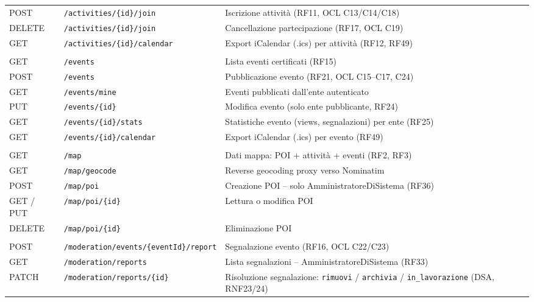 \documentclass[11pt,a4paper]{article}
\newcommand{\code}[1]{\texttt{\small#1}}
\begin{document}
\begin{small}
\begin{longtable}{>{\centering\arraybackslash}p{1.6cm} p{7.2cm} p{6.2cm}}
  \rowcolor{rowAlt}POST & \code{/activities/\{id\}/join} & Iscrizione attivit\`{a} (RF11, OCL C13/C14/C18) \\
  DELETE & \code{/activities/\{id\}/join} & Cancellazione partecipazione (RF17, OCL C19) \\
  \rowcolor{rowAlt}GET & \code{/activities/\{id\}/calendar} & Export iCalendar (.ics) per attivit\`{a} (RF12, RF49) \\
  \midrule
  \multicolumn{3}{l}{\textbf{Eventi certificati}} \\
  \midrule
  GET & \code{/events} & Lista eventi certificati (RF15) \\
  \rowcolor{rowAlt}POST & \code{/events} & Pubblicazione evento (RF21, OCL C15--C17, C24) \\
  GET & \code{/events/mine} & Eventi pubblicati dall'ente autenticato \\
  \rowcolor{rowAlt}PUT & \code{/events/\{id\}} & Modifica evento (solo ente pubblicante, RF24) \\
  GET & \code{/events/\{id\}/stats} & Statistiche evento (views, segnalazioni) per ente (RF25) \\
  \rowcolor{rowAlt}GET & \code{/events/\{id\}/calendar} & Export iCalendar (.ics) per evento (RF49) \\
  \midrule
  \multicolumn{3}{l}{\textbf{Mappa e POI}} \\
  \midrule
  GET & \code{/map} & Dati mappa: POI + attivit\`{a} + eventi (RF2, RF3) \\
  \rowcolor{rowAlt}GET & \code{/map/geocode} & Reverse geocoding proxy verso Nominatim \\
  POST & \code{/map/poi} & Creazione POI -- solo AmministratoreDiSistema (RF36) \\
  \rowcolor{rowAlt}GET / PUT & \code{/map/poi/\{id\}} & Lettura o modifica POI \\
  DELETE & \code{/map/poi/\{id\}} & Eliminazione POI \\
  \midrule
  \multicolumn{3}{l}{\textbf{Moderazione}} \\
  \midrule
  \rowcolor{rowAlt}POST & \code{/moderation/events/\{eventId\}/report} & Segnalazione evento (RF16, OCL C22/C23) \\
  GET & \code{/moderation/reports} & Lista segnalazioni -- AmministratoreDiSistema (RF33) \\
  \rowcolor{rowAlt}PATCH & \code{/moderation/reports/\{id\}} & Risoluzione segnalazione: \texttt{rimuovi} / \texttt{archivia} / \texttt{in\_lavorazione} (DSA, RNF23/24) \\

\end{longtable}
\end{small}
\end{document}
